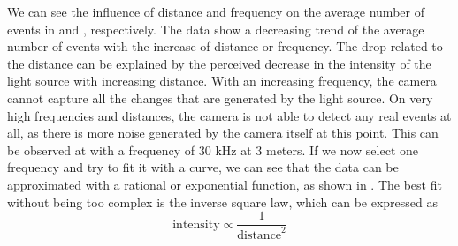 We can see the influence of distance and frequency on the average number of events in  and , respectively. The data show a decreasing trend of the average number of events
with the increase of distance or frequency. The drop related to the distance can be explained by the perceived decrease in the intensity of the light source with increasing distance. With an increasing frequency, the camera cannot capture
all the changes that are generated by the light source. On very high frequencies and distances, the camera is not able
to detect any real events at all, as there is more noise generated by the camera itself at this point. This can be observed
at  with a frequency of $30$ kHz at $3$ meters.
If we now select one frequency and try to fit it with a curve,
we can see that the data can be approximated with a rational or exponential function, as shown in .
The best fit without being too complex is the inverse square law, which can be expressed as
\begin{equation}
	\text{intensity} \propto \frac{1}{\text{distance}^2}
\end{equation}

